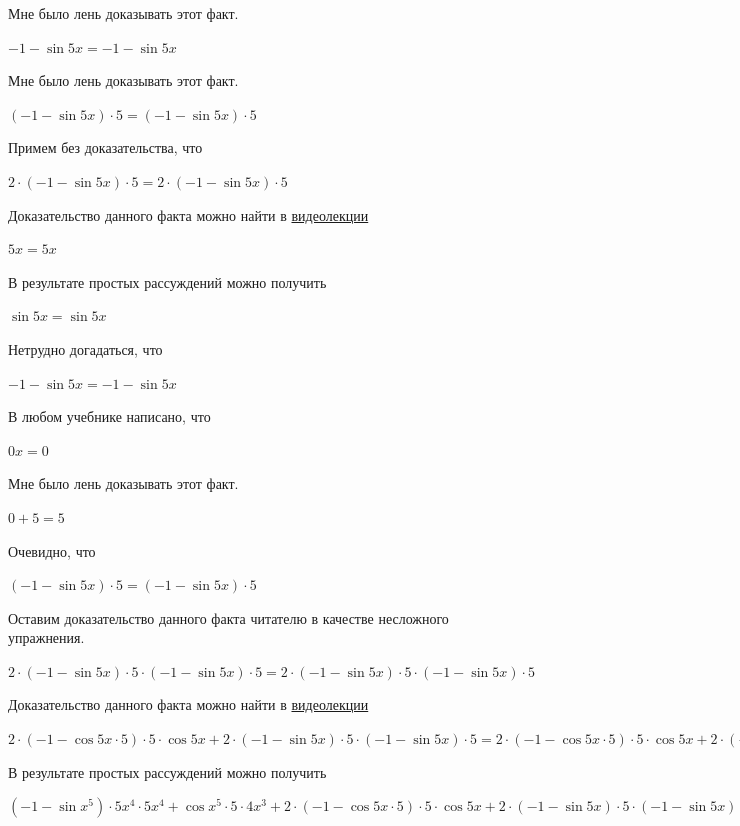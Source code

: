 \documentclass[12pt,a4paper,fleqn]{article}
\theoremstyle{definition}
\begin{document}
Мне было лень доказывать этот факт.

$ -1  - \sin 5  x  =  -1  - \sin 5  x $

Мне было лень доказывать этот факт.

$( -1  - \sin 5  x ) \cdot  5  = ( -1  - \sin 5  x ) \cdot  5 $

Примем без доказательства, что 

$ 2  \cdot ( -1  - \sin 5  x ) \cdot  5  =  2  \cdot ( -1  - \sin 5  x ) \cdot  5 $

Доказательство данного факта можно найти в \href{https://www.youtube.com/watch?v=dQw4w9WgXcQ}{видеолекции} 

$ 5  x  =  5  x $

В результате простых рассуждений можно получить 

$\sin 5  x  = \sin 5  x $

Нетрудно догадаться, что 

$ -1  - \sin 5  x  =  -1  - \sin 5  x $

В любом учебнике написано, что 

$ 0  x  =  0 $

Мне было лень доказывать этот факт.

$ 0  +  5  =  5 $

Очевидно, что 

$( -1  - \sin 5  x ) \cdot  5  = ( -1  - \sin 5  x ) \cdot  5 $

Оставим доказательство данного факта читателю в качестве несложного упражнения. 

$ 2  \cdot ( -1  - \sin 5  x ) \cdot  5  \cdot ( -1  - \sin 5  x ) \cdot  5  =  2  \cdot ( -1  - \sin 5  x ) \cdot  5  \cdot ( -1  - \sin 5  x ) \cdot  5 $

Доказательство данного факта можно найти в \href{https://www.youtube.com/watch?v=dQw4w9WgXcQ}{видеолекции} 

$ 2  \cdot ( -1  - \cos 5  x  \cdot  5 ) \cdot  5  \cdot \cos 5  x  +  2  \cdot ( -1  - \sin 5  x ) \cdot  5  \cdot ( -1  - \sin 5  x ) \cdot  5  =  2  \cdot ( -1  - \cos 5  x  \cdot  5 ) \cdot  5  \cdot \cos 5  x  +  2  \cdot ( -1  - \sin 5  x ) \cdot  5  \cdot ( -1  - \sin 5  x ) \cdot  5 $

В результате простых рассуждений можно получить 

$( -1  - \sin{ x }^{ 5 }) \cdot  5 { x }^{ 4 } \cdot  5 { x }^{ 4 } + \cos{ x }^{ 5 } \cdot  5  \cdot  4 { x }^{ 3 } +  2  \cdot ( -1  - \cos 5  x  \cdot  5 ) \cdot  5  \cdot \cos 5  x  +  2  \cdot ( -1  - \sin 5  x ) \cdot  5  \cdot ( -1  - \sin 5  x ) \cdot  5  = ( -1  - \sin{ x }^{ 5 }) \cdot  5 { x }^{ 4 } \cdot  5 { x }^{ 4 } + \cos{ x }^{ 5 } \cdot  5  \cdot  4 { x }^{ 3 } +  2  \cdot ( -1  - \cos 5  x  \cdot  5 ) \cdot  5  \cdot \cos 5  x  +  2  \cdot ( -1  - \sin 5  x ) \cdot  5  \cdot ( -1  - \sin 5  x ) \cdot  5 $
\end{document}
